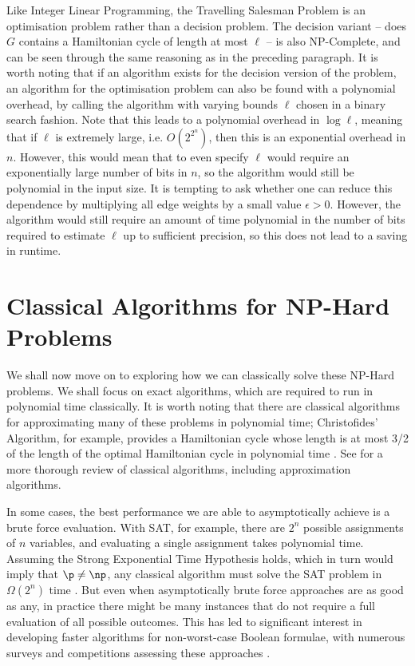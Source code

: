 Like Integer Linear Programming, the Travelling Salesman Problem is an optimisation problem rather than a decision problem. The decision variant -- does $G$ contains a Hamiltonian cycle of length at most $\ell$ -- is also NP-Complete, and can be seen through the same reasoning as in the preceding paragraph. It is worth noting that if an algorithm exists for the decision version of the problem, an algorithm for the optimisation problem can also be found with a polynomial overhead, by calling the algorithm with varying bounds $\ell$ chosen in a binary search fashion. Note that this leads to a polynomial overhead in $\log\ell$, meaning that if $\ell$ is extremely large, i.e. $O\left(2^{2^n}\right)$, then this is an exponential overhead in $n$. However, this would mean that to even specify $\ell$ would require an exponentially large number of bits in $n$, so the algorithm would still be polynomial in the input size. It is tempting to ask whether one can reduce this dependence by multiplying all edge weights by a small value $\epsilon > 0$. However, the algorithm would still require an amount of time polynomial in the number of bits required to estimate $\ell$ up to sufficient precision, so this does not lead to a saving in runtime.

\section{Classical Algorithms for NP-Hard Problems}
\label{sec:classical-np}

We shall now move on to exploring how we can classically solve these NP-Hard problems. We shall focus on exact algorithms, which are required to run in polynomial time classically. It is worth noting that there are classical algorithms for approximating many of these problems in polynomial time; Christofides' Algorithm, for example, provides a Hamiltonian cycle whose length is at most 3/2 of the length of the optimal Hamiltonian cycle in polynomial time \cite{christofides1976}. See \cite{garey1979} for a more thorough review of classical algorithms, including approximation algorithms.

In some cases, the best performance we are able to asymptotically achieve is a brute force evaluation. With SAT, for example, there are $2^n$ possible assignments of $n$ variables, and evaluating a single assignment takes polynomial time. Assuming the Strong Exponential Time Hypothesis holds, which in turn would imply that $\p \neq \np$, any classical algorithm must solve the SAT problem in $\Omega(2^n)$ time \cite{calabro2009}. But even when asymptotically brute force approaches are as good as any, in practice there might be many instances that do not require a full evaluation of all possible outcomes. This has led to significant interest in developing faster algorithms for non-worst-case Boolean formulae, with numerous surveys and competitions assessing these approaches \cite{sohanghpurwala2017, sat18}.

